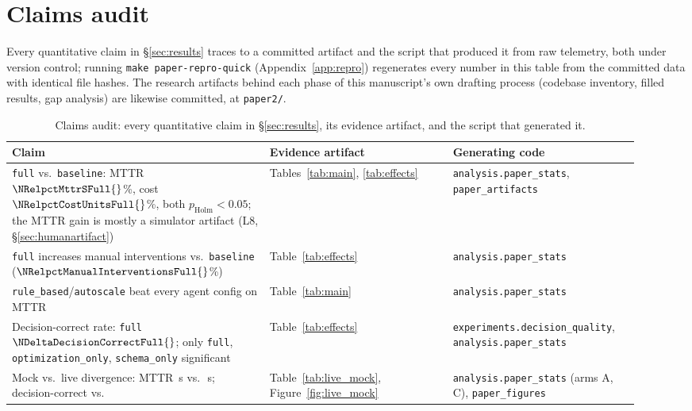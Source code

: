 \section{Claims audit}\label{app:claims}

Every quantitative claim in \S\ref{sec:results} traces to a committed artifact and the script that
produced it from raw telemetry, both under version control; running \texttt{make paper-repro-quick}
(Appendix~\ref{app:repro}) regenerates every number in this table from the committed data with
identical file hashes. The research artifacts behind each phase of this manuscript's own drafting
process (codebase inventory, filled results, gap analysis) are likewise committed, at
\texttt{paper2/}.

\begin{table}[t]
\centering
\caption{Claims audit: every quantitative claim in \S\ref{sec:results}, its evidence artifact, and
  the script that generated it.}
\label{tab:claims}
\small
\begin{tabular}{@{}p{0.38\linewidth}p{0.27\linewidth}p{0.27\linewidth}@{}}
\toprule
Claim & Evidence artifact & Generating code \\
\midrule
\texttt{full} vs.\ \texttt{baseline}: MTTR $\NRelpctMttrSFull{}$\%, cost $\NRelpctCostUnitsFull{}$\%,
  both $p_{\mathrm{Holm}}<0.05$; the MTTR gain is mostly a simulator artifact (L8, \S\ref{sec:humanartifact}) &
  Tables~\ref{tab:main}, \ref{tab:effects} &
  \texttt{analysis.paper\_stats}, \texttt{paper\_artifacts} \\
\texttt{full} increases manual interventions vs.\ \texttt{baseline} ($\NRelpctManualInterventionsFull{}$\%) &
  Table~\ref{tab:effects} &
  \texttt{analysis.paper\_stats} \\
\texttt{rule\_based}/\texttt{autoscale} beat every agent config on MTTR &
  Table~\ref{tab:main} &
  \texttt{analysis.paper\_stats} \\
Decision-correct rate: \texttt{full} $\NDeltaDecisionCorrectFull{}$; only \texttt{full},
  \texttt{optimization\_only}, \texttt{schema\_only} significant &
  Table~\ref{tab:effects} &
  \texttt{experiments.\allowbreak decision\_quality}, \texttt{analysis.paper\_stats} \\
Mock vs.\ live divergence: MTTR \NLiveVsMockMttrSLive{}\,s vs.\ \NLiveVsMockMttrSMock{}\,s;
  decision-correct \NLiveVsMockDecisionCorrectLive{} vs.\ \NLiveVsMockDecisionCorrectMock{} &
  Table~\ref{tab:live_mock}, Figure~\ref{fig:live_mock} &
  \texttt{analysis.\allowbreak paper\_stats} (arms A, C), \texttt{paper\_\allowbreak figures} \\

\end{tabular}
\end{table}
